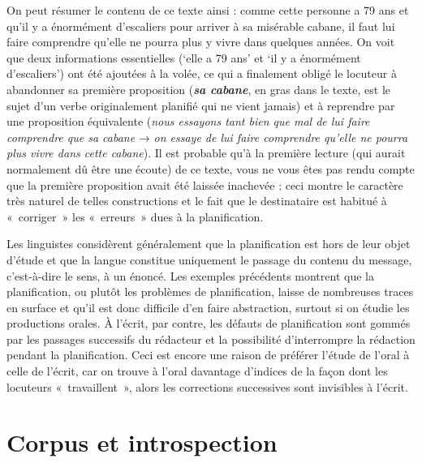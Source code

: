 On peut résumer le contenu de ce texte ainsi : comme cette personne a 79 ans et qu’il y a énormément d’escaliers pour arriver à sa misérable cabane, il faut lui faire comprendre qu’elle ne pourra plus y vivre dans quelques années. On voit que deux informations essentielles (‘elle a 79 ans’ et ‘il y a énormément d’escaliers’) ont été ajoutées à la volée, ce qui a finalement obligé le locuteur à abandonner sa première proposition (\textbf{\textit{sa cabane}}, en gras dans le texte, est le sujet d’un verbe originalement planifié qui ne vient jamais) et à reprendre par une proposition équivalente (\textit{nous essayons tant bien que mal de lui faire comprendre que sa cabane} → \textit{on essaye de lui faire comprendre qu’elle ne pourra plus vivre dans cette cabane}). Il est probable qu’à la première lecture (qui aurait normalement dû être une écoute) de ce texte, vous ne vous êtes pas rendu compte que la première proposition avait été laissée inachevée : ceci montre le caractère très naturel de telles constructions et le fait que le destinataire est habitué à «~corriger~» les «~erreurs~» dues à la planification.

Les linguistes considèrent généralement que la planification est hors de leur objet d’étude et que la langue constitue uniquement le passage du contenu du message, c’est-à-dire le sens, à un énoncé. Les exemples précédents montrent que la planification, ou plutôt les problèmes de planification, laisse de nombreuses traces en surface et qu’il est donc difficile d’en faire abstraction, surtout si on étudie les productions orales. À l’écrit, par contre, les défauts de planification sont gommés par les passages successifs du rédacteur et la possibilité d’interrompre la rédaction pendant la planification. Ceci est encore une raison de préférer l’étude de l’oral à celle de l’écrit, car on trouve à l’oral davantage d’indices de la façon dont les locuteurs «~travaillent~», alors les corrections successives sont invisibles à l’écrit.

\section{Corpus et introspection}\label{sec:1.1.10}

